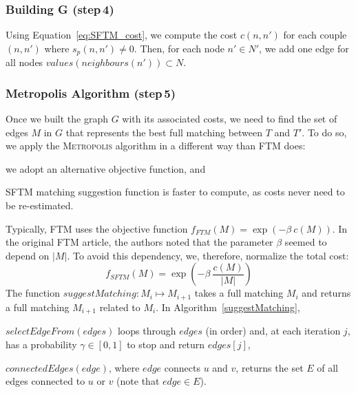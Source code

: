 \subsubsection{Building G (step\,4)}
Using Equation~\ref{eq:SFTM_cost}, we compute the cost $c(n,n')$ for each couple $(n,n')$ where $s_p(n,n') \neq 0$.
Then, for each node $n'\in N'$, we add one edge for all nodes $values(neighbours(n')) \subset N$.

\subsubsection{Metropolis Algorithm (step\,5)}
Once we built the graph $G$ with its associated costs, we need to find the set of edges $M$ in $G$ that represents the best full matching between $T$ and $T'$.
To do so, we apply the \textsc{Metropolis} algorithm in a different way than FTM does: 
\begin{inparaenum}
	\item we adopt an alternative objective function, and
    \item SFTM matching suggestion function is faster to compute, as costs never need to be re-estimated.
\end{inparaenum}

Typically, FTM uses the objective function $f_{FTM}(M) = \exp(-\beta\ c(M))$.
In the original FTM article, the authors noted that the parameter $\beta$ seemed to depend on $|M|$.
To avoid this dependency, we, therefore, normalize the total cost:
\begin{equation}
	f_{SFTM}(M) = \exp(-\beta\ \frac{c(M)}{|M|})
\end{equation}
The function $suggestMatching: M_i \mapsto M_{i+1}$ takes a full matching $M_i$ and returns a full matching $M_{i+1}$ related to $M_i$.
In Algorithm~\ref{suggestMatching}, 
\begin{compactenum}
	\item $selectEdgeFrom(edges)$ loops through $edges$ (in order) and, at each iteration $j$, has a probability $\gamma \in [0,1]$ to stop and return $edges[j]$,
    \item $connectedEdges(edge)$, where $edge$ connects $u$ and $v$, returns the set $E$ of all edges connected to $u$ or $v$ (note that $edge \in E$).
\end{compactenum}

